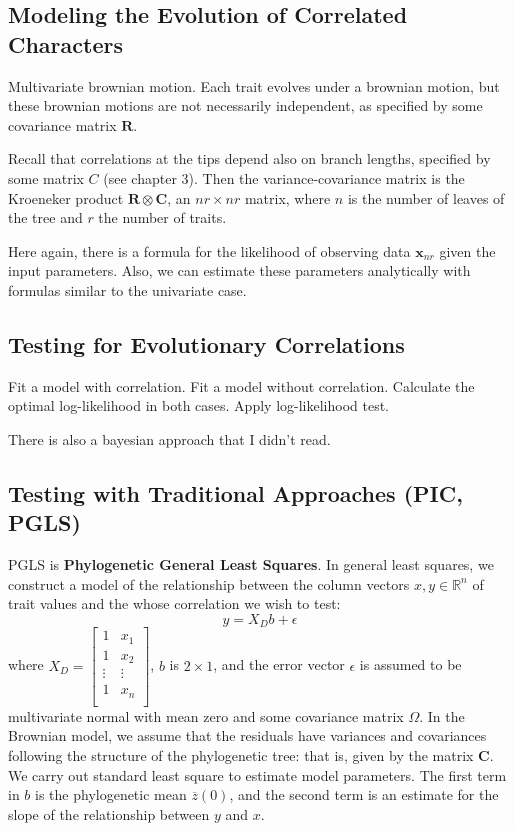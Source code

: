 \documentclass{article}
\def\R{\mathbb{R}} \def\Z{\mathbb{Z}} \def\E{\mathbb{E}} \def\P{\mathbb{P}}
\begin{document}
\subsection{Modeling the Evolution of Correlated Characters}
Multivariate brownian motion. Each trait evolves under a brownian motion, but
these brownian motions are not necessarily independent, as specified by some
covariance matrix $\mathbf{R}$.

Recall that correlations at the tips depend also on branch lengths, specified by
some matrix $C$ (see chapter 3). Then the variance-covariance matrix is the
Kroeneker product $\mathbf{R}\otimes \mathbf{C}$, an $nr\times nr$ matrix, where
$n$ is the number of leaves of the tree and $r$ the number of traits.

Here again, there is a formula for the likelihood of observing data
$\mathbf{x}_{nr}$ given the input parameters. Also, we can estimate these
parameters analytically with formulas similar to the univariate case.

\subsection{Testing for Evolutionary Correlations}
Fit a model with correlation. Fit a model without correlation. Calculate the
optimal log-likelihood in both cases. Apply log-likelihood test.

There is also a bayesian approach that I didn't read.

\subsection{Testing with Traditional Approaches (PIC, PGLS)}

PGLS is \textbf{Phylogenetic General Least Squares}. In general least squares,
we construct a model of the relationship between the column vectors
$x,y\in \R^{n}$ of trait values and the whose correlation we wish to test:
\begin{equation*}
  y = X_{D}b + \epsilon
\end{equation*}
where
$X_{D} = \begin{bmatrix} 1 & x_1 \\ 1 & x_2 \\ \vdots & \vdots \\ 1 & x_n
  \\ \end{bmatrix}$, $b$ is $2\times 1$, and the error vector $\epsilon$ is
assumed to be multivariate normal with mean zero and some covariance matrix
$\Omega$. In the Brownian model, we assume that the residuals have variances and
covariances following the structure of the phylogenetic tree: that is, given by
the matrix $\mathbf{C}$. We carry out standard least square to estimate model
parameters. The first term in $b$ is the phylogenetic mean $\overline{z}(0)$,
and the second term is an estimate for the slope of the relationship between $y$
and $x$.
\end{document}
